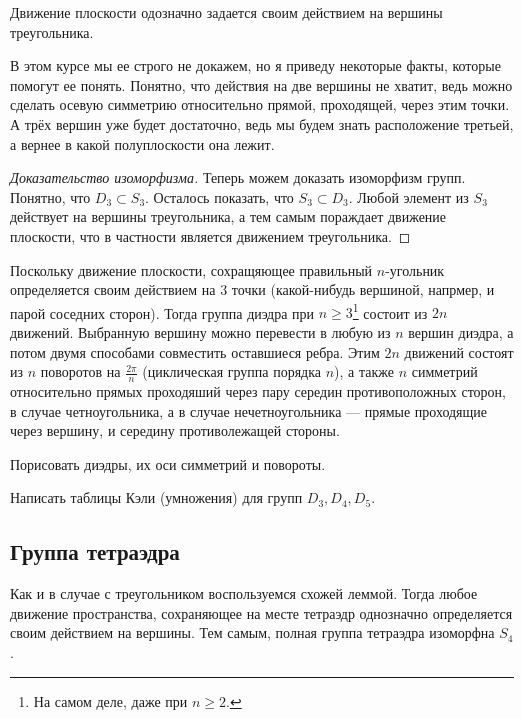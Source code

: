 \begin{lemma}
    Движение плоскости одозначно задается своим действием на вершины треугольника.
\end{lemma}

В этом курсе мы ее строго не докажем, но я приведу некоторые факты, которые помогут ее понять. Понятно, что действия на две вершины не хватит, ведь можно сделать осевую симметрию относительно прямой, проходящей, через этим точки. А трёх вершин уже будет достаточно, ведь мы будем знать расположение третьей, а вернее в какой полуплоскости она лежит.

\begin{proof}
    [Доказательство изоморфизма]
    Теперь можем доказать изоморфизм групп. Понятно, что $D_3 \subset S_3$. Осталось показать, что $S_3 \subset D_3$. Любой элемент из $S_3$ действует на вершины треугольника, а тем самым пораждает движение плоскости, что в частности является движением треугольника.
\end{proof}

Поскольку движение плоскости, сохращяющее правильный $n$-угольник определяется своим действием на 3 точки (какой-нибудь вершиной, напрмер, и парой соседних сторон). Тогда группа диэдра при $n \geqslant 3$\footnote{На самом деле, даже при $n \geqslant 2$.} состоит из $2n$ движений. Выбранную вершину можно перевести в любую из $n$ вершин диэдра, а потом двумя способами совместить оставшиеся ребра. Этим $2n$ движений состоят из $n$ поворотов на $\frac{2\pi}{n}$ (циклическая группа порядка $n$), а также $n$ симметрий относительно прямых проходяший через пару середин противоположных сторон, в случае четноугольника, а в случае нечетноугольника --- прямые проходящие через вершину, и середину противолежащей стороны.

\begin{practice}
    Порисовать диэдры, их оси симметрий и повороты. 
\end{practice}
\begin{practice}
    Написать таблицы Кэли (умножения) для групп $D_3, D_4, D_5$.
\end{practice}

\subsection{Группа тетраэдра}

Как и в случае с треугольником воспользуемся схожей леммой. Тогда любое движение пространства, сохраняющее на месте тетраэдр однозначно определяется своим действием на вершины. Тем самым, полная группа тетраэдра изоморфна $S_4$.

